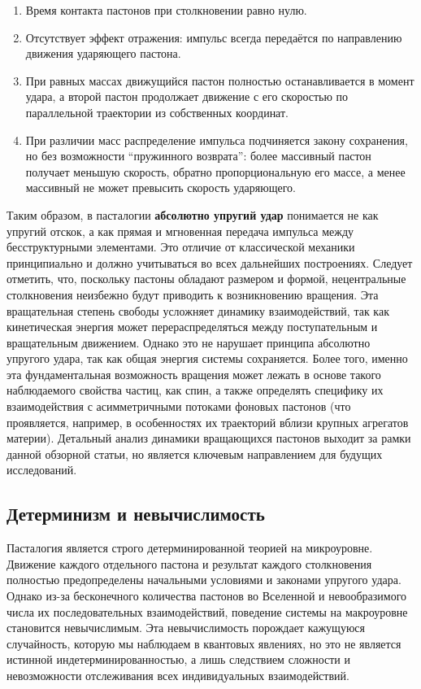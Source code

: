 \documentclass[pdflatex,sn-mathphys-num,referee]{sn-jnl}
\begin{document}
\begin{enumerate}
  \item Время контакта пастонов при столкновении равно нулю.
  \item Отсутствует эффект отражения: импульс всегда передаётся по направлению движения ударяющего пастона.
  \item При равных массах движущийся пастон полностью останавливается в момент удара, а второй пастон продолжает движение с его скоростью по параллельной траектории из собственных координат.
  \item При различии масс распределение импульса подчиняется закону сохранения, но без возможности ``пружинного возврата'': более массивный пастон получает меньшую скорость, обратно пропорциональную его массе, а менее массивный не может превысить скорость ударяющего.
\end{enumerate}

Таким образом, в пасталогии \textbf{абсолютно упругий удар} понимается не как упругий отскок, а как прямая и мгновенная передача импульса между бесструктурными элементами. Это отличие от классической механики принципиально и должно учитываться во всех дальнейших построениях. Следует отметить, что, поскольку пастоны обладают размером и формой, нецентральные столкновения неизбежно будут приводить к возникновению вращения. Эта вращательная степень свободы усложняет динамику взаимодействий, так как кинетическая энергия может перераспределяться между поступательным и вращательным движением. Однако это не нарушает принципа абсолютно упругого удара, так как общая энергия системы сохраняется. Более того, именно эта фундаментальная возможность вращения может лежать в основе такого наблюдаемого свойства частиц, как спин, а также определять специфику их взаимодействия с асимметричными потоками фоновых пастонов (что проявляется, например, в особенностях их траекторий вблизи крупных агрегатов материи). Детальный анализ динамики вращающихся пастонов выходит за рамки данной обзорной статьи, но является ключевым направлением для будущих исследований.

\subsection{Детерминизм и невычислимость}\label{subsec:determinism}

Пасталогия является строго детерминированной теорией на микроуровне. Движение каждого отдельного пастона и результат каждого столкновения полностью предопределены начальными условиями и законами упругого удара. Однако из-за бесконечного количества пастонов во Вселенной и невообразимого числа их последовательных взаимодействий, поведение системы на макроуровне становится невычислимым. Эта невычислимость порождает кажущуюся случайность, которую мы наблюдаем в квантовых явлениях, но это не является истинной индетерминированностью, а лишь следствием сложности и невозможности отслеживания всех индивидуальных взаимодействий.
\end{document}
